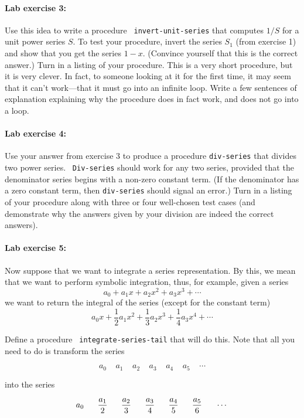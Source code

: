 \paragraph{Lab exercise 3:} Use this idea to write a procedure {\tt
invert-unit-series} that computes $1/S$ for a unit power series $S$.
To test your procedure, invert the series $S_1$ (from exercise 1) and
show that you get the series $1-x$.  (Convince yourself that this is
the correct answer.)  Turn in a listing of your procedure.  This is a
very short procedure, but it is very clever.  In fact, to someone
looking at it for the first time, it may seem that it can't
work---that it must go into an infinite loop.  Write a few sentences
of explanation explaining why the procedure does in fact work, and
does not go into a loop.

\paragraph{Lab exercise 4:} Use your answer from exercise 3 to produce
a procedure {\tt div-series} that divides two power series.  {\tt
Div-series} should work for any two series, provided that the
denominator series begins with a non-zero constant term.  (If the
denominator has a zero constant term, then {\tt div-series} should
signal an error.)  Turn in a listing of your procedure along with
three or four well-chosen test cases (and demonstrate why the answers
given by your division are indeed the correct answers).

\paragraph{Lab exercise 5:}  Now suppose that we want to integrate a
series representation.  By this, we mean that we want to perform
symbolic integration, thus, for example, 
given a series
\[ a_0 + a_1 x + a_2 x^2 + a_3 x^3 + \cdots \]
we want to return the integral of the series (except for the constant term) 
\[ a_0 x + \frac{1}{2}a_1 x^2 + \frac{1}{3}a_2 x^3 + \frac{1}{4}a_3 x^4 + \cdots \]

Define a procedure {\tt
integrate-series-tail} that will do this.   Note that all you need to
do is transform the series

\[ a_0 \ \ \ \ \  a_1 \ \ \ \ \  a_2  \ \ \ \ \  a_3  \ \ \ \ \   a_4  \ \ \ \ \   a_5  \ \ \ \ \  \cdots \]

into the series 

\[ a_0 \ \ \ \ \  {a_1 \over 2} \ \ \ \ \  {a_2 \over 3}  \ \ \ \ \
{a_3 \over 4}  \ \ \ \ \  
{a_4 \over 5}  \ \ \ \ \  
{a_5 \over 6}  \ \ \ \ \  \cdots \]

